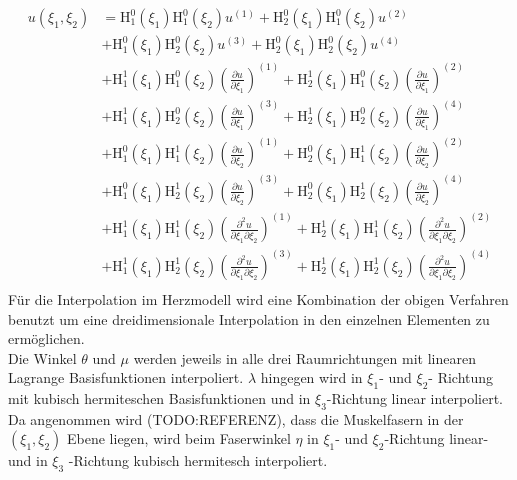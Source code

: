\documentclass[
	a4paper,			%
	11pt,				%
	headsepline,		%
	bibtotoc,			%
	BCOR18mm,      		%
	DIV14,				%
	headings=normal,
	numbers=noenddot,
]{scrbook}
\theoremstyle{mythmstyle}
\theoremstyle{other}
\begin{document}
	 	\begin{equation}
	 	\begin{split}
		u(\xi_1, \xi_2) &= \mathrm{H}^0_1(\xi_1)\mathrm{H}^0_1(\xi_2)u^{(1)}+
		 \mathrm{H}^0_2(\xi_1)\mathrm{H}^0_1(\xi_2)u^{(2)}\\
						&+ \mathrm{H}^0_1(\xi_1)\mathrm{H}^0_2(\xi_2)u^{(3)}+
		 \mathrm{H}^0_2(\xi_1)\mathrm{H}^0_2(\xi_2)u^{(4)}\\
		 &+\mathrm{H}^1_1(\xi_1) \mathrm{H}^0_1(\xi_2)
		 \left(\frac{\partial u}{\partial \xi_1}\right)^{(1)}
		 +\mathrm{H}^1_2(\xi_1) \mathrm{H}^0_1(\xi_2)
		 \left( \frac{\partial u}{\partial \xi_1}\right)^{(2)}\\
		 &+\mathrm{H}^1_1(\xi_1) \mathrm{H}^0_2(\xi_2)
		 \left(\frac{\partial u}{\partial \xi_1}\right)^{(3)}
		 +\mathrm{H}^1_2(\xi_1) \mathrm{H}^0_2(\xi_2)
		 \left( \frac{\partial u}{\partial \xi_1}\right)^{(4)}\\
		 &+\mathrm{H}^0_1(\xi_1) \mathrm{H}^1_1(\xi_2)
		 \left(\frac{\partial u}{\partial \xi_2}\right)^{(1)}
		 +\mathrm{H}^0_2(\xi_1) \mathrm{H}^1_1(\xi_2)
		 \left( \frac{\partial u}{\partial \xi_2}\right)^{(2)}\\
		 		 &+\mathrm{H}^0_1(\xi_1) \mathrm{H}^1_2(\xi_2)
		 \left(\frac{\partial u}{\partial \xi_2}\right)^{(3)}
		 +\mathrm{H}^0_2(\xi_1) \mathrm{H}^1_2(\xi_2)
		 \left( \frac{\partial u}{\partial \xi_2}\right)^{(4)}\\
		 		 &+\mathrm{H}^1_1(\xi_1) \mathrm{H}^1_1(\xi_2)
		 \left(\frac{\partial^2 u}{\partial \xi_1 \partial \xi_2}\right)^{(1)}
		 +\mathrm{H}^1_2(\xi_1) \mathrm{H}^1_1(\xi_2)
		 \left( \frac{\partial^2 u}{\partial \xi_1 \partial \xi_2}\right)^{(2)}\\
		  	&+\mathrm{H}^1_1(\xi_1) \mathrm{H}^1_2(\xi_2)
		 \left(\frac{\partial^2 u}{\partial \xi_1 \partial \xi_2}\right)^{(3)}
		 +\mathrm{H}^1_2(\xi_1) \mathrm{H}^1_2(\xi_2)
		 \left( \frac{\partial^2 u}{\partial \xi_1 \partial \xi_2}\right)^{(4)}\\
	 	\end{split}
	 	\label{eq:bicubic_hermite_iterpolation}
	 	\end{equation}
	 	Für die Interpolation im Herzmodell wird eine Kombination der obigen Verfahren benutzt um eine  
	 	dreidimensionale Interpolation in den einzelnen Elementen zu ermöglichen.\\
	 	Die Winkel $\theta$ und $\mu$ werden jeweils in alle drei Raumrichtungen mit linearen Lagrange
	 	Basisfunktionen interpoliert. $\lambda$ hingegen wird in $\xi_1$- und $\xi_2$- Richtung mit kubisch
	 	hermiteschen Basisfunktionen und in $\xi_3$-Richtung linear interpoliert. \\
	 	Da angenommen wird (TODO:REFERENZ), dass die Muskelfasern in der $(\xi_1,\xi_2)$ Ebene liegen, 
	 	wird beim Faserwinkel $\eta$ in $\xi_1$- und $\xi_2$-Richtung linear-
	 	 und in $\xi_3$ -Richtung kubisch hermitesch interpoliert\cite{paper2}.
	 	 
\end{document}
